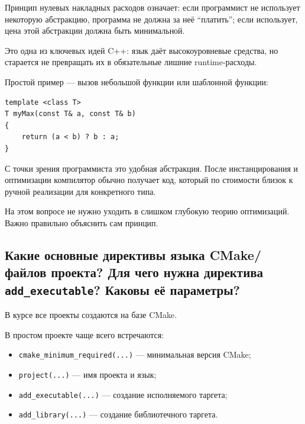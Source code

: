 \begin{definition}
Принцип нулевых накладных расходов означает: если программист не использует некоторую абстракцию, программа не должна за неё ``платить''; если использует, цена этой абстракции должна быть минимальной.
\end{definition}

Это одна из ключевых идей C++: язык даёт высокоуровневые средства, но старается не превращать их в обязательные лишние runtime-расходы.

\begin{example}
Простой пример --- вызов небольшой функции или шаблонной функции:
\begin{verbatim}
template <class T>
T myMax(const T& a, const T& b)
{
    return (a < b) ? b : a;
}
\end{verbatim}
С точки зрения программиста это удобная абстракция. После инстанцирования и оптимизации компилятор обычно получает код, который по стоимости близок к ручной реализации для конкретного типа.
\end{example}

\begin{remark}
На этом вопросе не нужно уходить в слишком глубокую теорию оптимизаций. Важно правильно объяснить сам принцип.
\end{remark}


\subsection{Какие основные директивы языка CMake/файлов проекта? Для чего нужна директива \texttt{add\_executable}? Каковы её параметры?}

В курсе все проекты создаются на базе CMake.

\begin{definition}
В простом проекте чаще всего встречаются:
\begin{itemize}
    \item \texttt{cmake\_minimum\_required(...)} --- минимальная версия CMake;
    \item \texttt{project(...)} --- имя проекта и язык;
    \item \texttt{add\_executable(...)} --- создание исполняемого таргета;
    \item \texttt{add\_library(...)} --- создание библиотечного таргета.
\end{itemize}
\end{definition}

